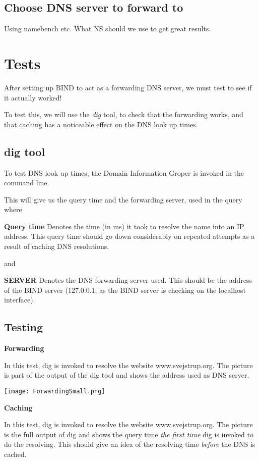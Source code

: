 \subsection{Choose DNS server to forward to}
Using namebench etc. What NS should we use to get great results.

\section{Tests}
After setting up BIND to act as a forwarding DNS server, we must test to see if it actually worked!

To test this, we will use the \textit{dig} tool, to check that the forwarding works, and that caching has a noticeable effect on the DNS look up times. 
\subsection{dig tool}
To test DNS look up times, the Domain Information Groper is invoked in the command line.

This will give us the query time and the forwarding server, used in the query where

\textbf{Query time}
Denotes the time (in ms) it took to resolve the name into an IP address.
This query time should go down considerably on repeated attempts as a result of caching DNS resolutions.

and

\textbf{SERVER}
Denotes the DNS forwarding server used. This should be the address of the BIND server (127.0.0.1, as the BIND server is checking on the localhost interface).


\subsection{Testing}
\textbf{Forwarding}

In this test, dig is invoked to resolve the website www.svejstrup.org. 
The picture is part of the output of the dig tool and shows the address used as DNS server.

\begin{center}
	\texttt{[image: ForwardingSmall.png]}
\end{center}

\textbf{Caching}

In this test, dig is invoked to resolve the website www.svejstrup.org.
The picture is the full output of dig and shows the query time \textit{the first time} dig is invoked to do the resolving. This should give an idea of the resolving time \textit{before} the DNS is cached.

